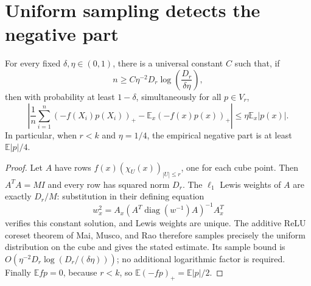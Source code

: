 \section{Uniform sampling detects the negative part}
\begin{lemma}\label{lem:schedule-relu}
For every fixed $\delta,\eta\in(0,1)$, there is a universal constant
$C$ such that, if
\[
 n\ge C\eta^{-2}D_r\log\!\left(\frac{D_r}{\delta\eta}\right),
\]
then with probability at least $1-\delta$, simultaneously for all
$p\in V_r$,
\[
 \left|\frac1n\sum_{i=1}^n(-f(X_i)p(X_i))_+
             -\mathbb E_x(-f(x)p(x))_+\right|
 \le\eta\mathbb E_x|p(x)|.
\]
In particular, when $r<k$ and $\eta=1/4$, the empirical negative
part is at least $\mathbb E|p|/4$.
\end{lemma}
\begin{proof}
Let $A$ have rows $f(x)(\chi_U(x))_{|U|\le r}$, one for each cube
point. Then $A^TA=MI$ and every row has squared norm $D_r$.
The $\ell_1$ Lewis weights of $A$ are exactly $D_r/M$: substitution
in their defining equation
\[
 w_x^2=A_x(A^T\operatorname{diag}(w^{-1})A)^{-1}A_x^T
\]
verifies this constant solution, and Lewis weights are unique.
The additive ReLU coreset theorem of Mai, Musco, and Rao
\cite[Theorem~5]{mai2021coresets} therefore samples precisely the uniform
distribution on the cube and gives the stated estimate. Its sample bound
is $O(\eta^{-2}D_r\log(D_r/(\delta\eta)))$; no additional logarithmic
factor is required. Finally $\mathbb E fp=0$, because $r<k$, so
$\mathbb E(-fp)_+=\mathbb E|p|/2$.
\end{proof}

